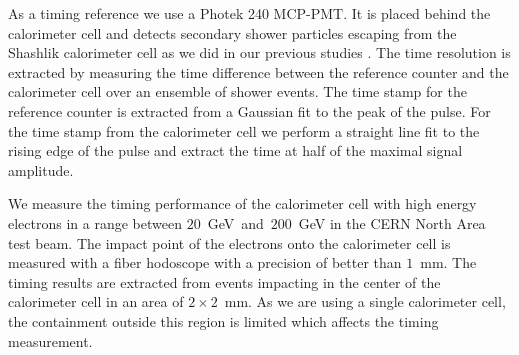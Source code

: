 As a timing reference we use a Photek 240 MCP-PMT. It is placed behind the calorimeter cell and detects secondary shower particles 
escaping from the Shashlik calorimeter cell as we did in our previous studies \cite{lysotiming}. The time resolution is extracted by
measuring the time difference between the reference counter and the calorimeter cell over an ensemble of shower events. The time stamp 
for the reference counter is extracted from a Gaussian fit to the peak of the pulse. For the time stamp from the calorimeter cell 
we perform a straight line fit to the rising edge of the pulse and extract the time at half of the maximal signal amplitude.

We measure the timing performance of the calorimeter cell with high energy electrons in a range between $20$~GeV~and~$200$~GeV in the CERN
North Area test beam. The impact point of the electrons onto the calorimeter cell is measured with a fiber hodoscope with a precision
of better than $1$~mm. The timing results are extracted from events impacting in the center of the calorimeter cell in an area of 
$2\times2$~mm. As we are using a single calorimeter cell, the containment outside this region is limited which affects the timing measurement.\\



